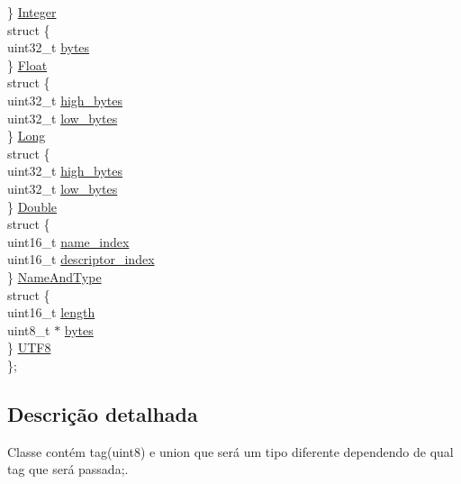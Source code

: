 \begin{DoxyCompactItemize}
\begin{tabbing}
\>\} \hyperlink{class_cp_info_a873ae1d00d8658008893f3397ad3535b}{Integer}\\
\>struct \{\\
\>\>uint32\_t \hyperlink{class_cp_info_aff3858879ad5feb452a5fc0504e99c1b}{bytes}\\
\>\} \hyperlink{class_cp_info_a8dd439e3f1f235a10abf65991a89c0e0}{Float}\\
\>struct \{\\
\>\>uint32\_t \hyperlink{class_cp_info_a4ddca9fe1db833914bba6fccab4a4966}{high\_bytes}\\
\>\>uint32\_t \hyperlink{class_cp_info_a361c4ed0f0ba7c54dec3469e1e2b67ce}{low\_bytes}\\
\>\} \hyperlink{class_cp_info_a57c0bb8dfad66c7c75c552ab6ca45563}{Long}\\
\>struct \{\\
\>\>uint32\_t \hyperlink{class_cp_info_a4ddca9fe1db833914bba6fccab4a4966}{high\_bytes}\\
\>\>uint32\_t \hyperlink{class_cp_info_a361c4ed0f0ba7c54dec3469e1e2b67ce}{low\_bytes}\\
\>\} \hyperlink{class_cp_info_a8d321b2411c3720d3009722182a2fbd5}{Double}\\
\>struct \{\\
\>\>uint16\_t \hyperlink{class_cp_info_a8337463c52221eaead88f232ded768a7}{name\_index}\\
\>\>uint16\_t \hyperlink{class_cp_info_a1e5f422fa619e06a2deb2728be023381}{descriptor\_index}\\
\>\} \hyperlink{class_cp_info_af8ab428cfd1348391c7d3b26d94d6567}{NameAndType}\\
\>struct \{\\
\>\>uint16\_t \hyperlink{class_cp_info_a8876751cacc7818d9748366a35ef85f7}{length}\\
\>\>uint8\_t $\ast$ \hyperlink{class_cp_info_acdf9242daedb1b37c82f24e6665edb10}{bytes}\\
\>\} \hyperlink{class_cp_info_a1959c604c24ea0a8c2ab8a4f3094f3e0}{UTF8}\\
\}; \\

\end{tabbing}\end{DoxyCompactItemize}


\subsection{Descrição detalhada}
Classe contém tag(uint8) e union que será um tipo diferente dependendo de qual tag que será passada;. 


